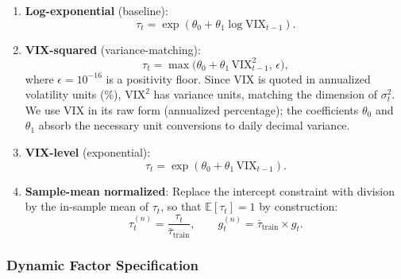 \documentclass[12pt,a4paper]{article}
\newcommand{\E}{\mathbb{E}}
\begin{document}
\begin{enumerate}[label=(\alph*)]
\item \textbf{Log-exponential} (baseline):
\begin{equation}
\tau_t = \exp(\theta_0 + \theta_1 \log \mathrm{VIX}_{t-1}).
\label{eq:tau_logexp}
\end{equation}

\item \textbf{VIX-squared} (variance-matching):
\begin{equation}
\tau_t = \max\!\big(\theta_0 + \theta_1 \, \mathrm{VIX}_{t-1}^2, \, \epsilon\big),
\label{eq:tau_vix2}
\end{equation}
where $\epsilon = 10^{-16}$ is a positivity floor. Since VIX is quoted in annualized volatility units (\%), $\mathrm{VIX}^2$ has variance units, matching the dimension of $\sigma_t^2$. We use VIX in its raw form (annualized percentage); the coefficients $\theta_0$ and $\theta_1$ absorb the necessary unit conversions to daily decimal variance.

\item \textbf{VIX-level} (exponential):
\begin{equation}
\tau_t = \exp(\theta_0 + \theta_1 \, \mathrm{VIX}_{t-1}).
\label{eq:tau_level}
\end{equation}

\item \textbf{Sample-mean normalized}: Replace the intercept constraint with division by the in-sample mean of $\tau_t$, so that $\E[\tau_t] = 1$ by construction:
\begin{equation}
\tau_t^{(n)} = \frac{\tau_t}{\bar{\tau}_{\text{train}}}, \qquad g_t^{(n)} = \bar{\tau}_{\text{train}} \times g_t.
\label{eq:tau_samplenorm}
\end{equation}
\end{enumerate}

\subsubsection{Dynamic Factor Specification}
\end{document}
